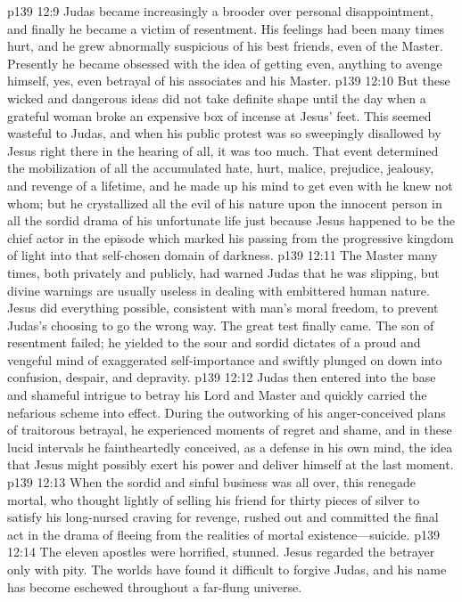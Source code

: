 \pc \vs p139 12:9 Judas became increasingly a brooder over personal disappointment, and finally he became a victim of resentment. His feelings had been many times hurt, and he grew abnormally suspicious of his best friends, even of the Master. Presently he became obsessed with the idea of getting even, anything to avenge himself, yes, even betrayal of his associates and his Master.
\vs p139 12:10 But these wicked and dangerous ideas did not take definite shape until the day when a grateful woman broke an expensive box of incense at Jesus’ feet. This seemed wasteful to Judas, and when his public protest was so sweepingly disallowed by Jesus right there in the hearing of all, it was too much. That event determined the mobilization of all the accumulated hate, hurt, malice, prejudice, jealousy, and revenge of a lifetime, and he made up his mind to get even with he knew not whom; but he crystallized all the evil of his nature upon the  innocent person in all the sordid drama of his unfortunate life just because Jesus happened to be the chief actor in the episode which marked his passing from the progressive kingdom of light into that self\hyp{}chosen domain of darkness.
\vs p139 12:11 The Master many times, both privately and publicly, had warned Judas that he was slipping, but divine warnings are usually useless in dealing with embittered human nature. Jesus did everything possible, consistent with man’s moral freedom, to prevent Judas’s choosing to go the wrong way. The great test finally came. The son of resentment failed; he yielded to the sour and sordid dictates of a proud and vengeful mind of exaggerated self\hyp{}importance and swiftly plunged on down into confusion, despair, and depravity.
\vs p139 12:12 Judas then entered into the base and shameful intrigue to betray his Lord and Master and quickly carried the nefarious scheme into effect. During the outworking of his anger\hyp{}conceived plans of traitorous betrayal, he experienced moments of regret and shame, and in these lucid intervals he faintheartedly conceived, as a defense in his own mind, the idea that Jesus might possibly exert his power and deliver himself at the last moment.
\vs p139 12:13 When the sordid and sinful business was all over, this renegade mortal, who thought lightly of selling his friend for thirty pieces of silver to satisfy his long\hyp{}nursed craving for revenge, rushed out and committed the final act in the drama of fleeing from the realities of mortal existence---suicide.
\vs p139 12:14 The eleven apostles were horrified, stunned. Jesus regarded the betrayer only with pity. The worlds have found it difficult to forgive Judas, and his name has become eschewed throughout a far\hyp{}flung universe.
